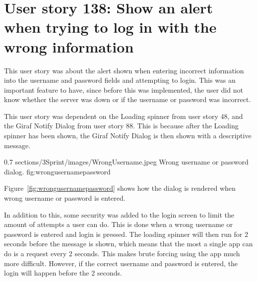 \section{User story 138: Show an alert when trying to log in with the wrong information}
This user story was about the alert shown when entering incorrect information into the username and password fields and attempting to login. This was an important feature to have, since before this was implemented, the user did not know whether the server was down or if the username or password was incorrect. 

This user story was dependent on the Loading spinner from user story 48, and the Giraf Notify Dialog from user story 88. This is because after the Loading spinner has been shown, the Giraf Notify Dialog is then shown with a descriptive message.


        {0.7} %
        {sections/3Sprint/images/WrongUsername.jpeg} %
        {Wrong username or password dialog.} %
        {fig:wrongusernamepassword} %

Figure~\ref{fig:wrongusernamepassword} shows how the dialog is rendered when wrong username or password is entered. 

In addition to this, some security was added to the login screen to limit the amount of attempts a user can do. This is done when a wrong username or password is entered and login is pressed. The loading spinner will then run for 2 seconds before the message is shown, which means that the most a single app can do is a request every 2 seconds. This makes brute forcing using the app much more difficult. However, if the correct username and password is entered, the login will happen before the 2 seconds. 

\iffalse
\subsubsection{Testing}
In order to test the new parts of the login screen, tests were written to press the buttons and test if logging in with wrong information showed the Dialog. This was written as integration tests, that fills a wrong username and password into the username and password text fields. When this is done the login button is pressed, and checked if a Giraf Notify Dialog is shown. 
\fi